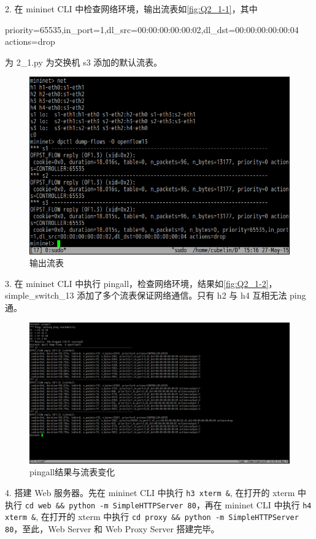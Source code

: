 \documentclass[format=draft,language=chinese,category=SDN]{hustreport}
\newcommand{\code}{\texttt}
\begin{document}
2. 在 mininet CLI 中检查网络环境，输出流表如\autoref{fig:Q2_1-1}，其中
\begin{center}
priority=65535,in\_port=1,dl\_src=00:00:00:00:00:02,dl\_dst=00:00:00:00:00:04 actions=drop
\end{center}

为 2\_1.py 为交换机 s3 添加的默认流表。

\begin{figure}[!h]
\centering
\includegraphics[width=.618\textwidth]{fig/2_1-1.png}
\caption{输出流表}\label{fig:Q2_1-1}
\end{figure}

3. 在 mininet CLI 中执行 pingall，检查网络环境，结果如\autoref{fig:Q2_1-2}，simple\_switch\_13 添加了多个流表保证网络通信。只有 h2 与 h4 互相无法 ping 通。

\begin{figure}[!h]
\centering
\includegraphics[width=\textwidth]{fig/2_1-2.png}
\caption{pingall结果与流表变化}\label{fig:Q2_1-2}
\end{figure}

4. 搭建 Web 服务器。先在 mininet CLI 中执行 \code{h3 xterm \&}, 在打开的 xterm 中执行 \code{cd web \&\& python -m SimpleHTTPServer 80}，再在 mininet CLI 中执行 \code{h4 xterm \&}, 在打开的 xterm 中执行 \code{cd proxy \&\& python -m SimpleHTTPServer 80}，至此，Web Server 和 Web Proxy Server 搭建完毕。
\end{document}
